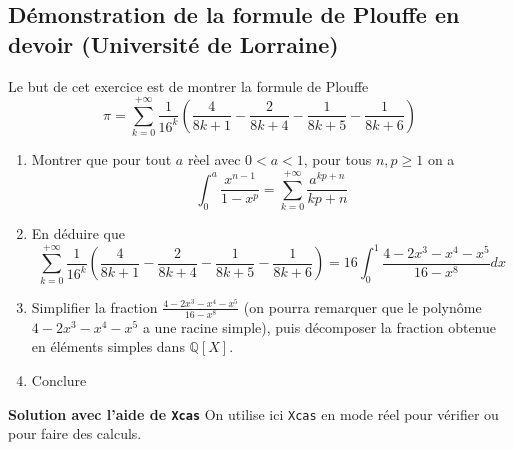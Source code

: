 \documentclass[a4paper,11pt]{book}
\newcommand{\Q}{{\mathbb{Q}}}
\begin{document}
\subsection{D\'emonstration de la formule de Plouffe en devoir (Universit\'e de Lorraine)}
Le but de cet exercice est de montrer la formule de Plouffe
$$\pi=\sum_{k=0}^{+\infty}\frac{1}{16^k}(\frac{4}{8k+1}-\frac{2}{8k+4}-\frac{1}{8k+5}-\frac{1}{8k+6})$$
\begin{enumerate}
\item Montrer que pour tout $a$ r\`eel avec $0 < a < 1$, pour tous $n, p \geq 1$
on a
$$\int_0^a\frac{x^{n-1}}{1-x^p}=\sum_{k=0}^{+\infty}\frac{a^{kp+n}}{kp+n}$$
\item En d\'eduire que
$$\sum_{k=0}^{+\infty}\frac{1}{16^k}(\frac{4}{8k+1}-\frac{2}{8k+4}-\frac{1}{8k+5}-\frac{1}{8k+6})=16\int_0^1\frac{4-2x^3-x^4-x^5}{16-x^8}dx$$
\item Simplifier la fraction $\displaystyle \frac{4-2x^3-x^4-x^5}{16-x^8}$ (on
pourra remarquer que le polyn\^ome $4-2x^3-x^4-x^5$ a une racine simple), puis
d\'ecomposer la fraction obtenue en \'el\'ements simples dans $\Q[X]$.
\item Conclure
\end{enumerate}
{\bf Solution avec l'aide de {\tt Xcas}}
On utilise ici {\tt Xcas} en mode r\'eel pour
v\'erifier ou pour faire des calculs.
\end{document}

